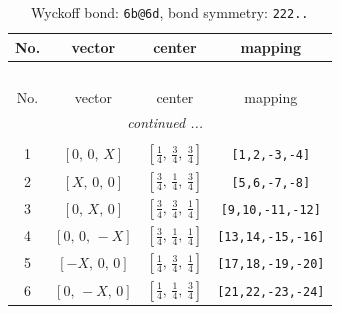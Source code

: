 \documentclass[fleqn,8pt]{jsarticle}
\begin{document}
\begin{longtable}{cccc}
\caption{Wyckoff bond: {\tt 6b@6d}, bond symmetry: {\tt 222..}}
 \\
 \hline \hline
No. & vector & center & mapping \\ \hline \endfirsthead

\multicolumn{3}{l}{\tablename\ \thetable{}} \\
 \hline \hline
No. & vector & center & mapping \\ \hline \endhead

 \hline \hline
\multicolumn{3}{r}{\footnotesize\it continued ...} \\ \endfoot

 \hline \hline
\multicolumn{3}{r}{} \\ \endlastfoot

1 & $\left[ 0,\, 0,\, X \right]$ & $\left[ \frac{1}{4},\, \frac{3}{4},\, \frac{3}{4} \right]$ & {\tt [1,2,-3,-4]} \\ \hline
2 & $\left[ X,\, 0,\, 0 \right]$ & $\left[ \frac{3}{4},\, \frac{1}{4},\, \frac{3}{4} \right]$ & {\tt [5,6,-7,-8]} \\ \hline
3 & $\left[ 0,\, X,\, 0 \right]$ & $\left[ \frac{3}{4},\, \frac{3}{4},\, \frac{1}{4} \right]$ & {\tt [9,10,-11,-12]} \\ \hline
4 & $\left[ 0,\, 0,\, - X \right]$ & $\left[ \frac{3}{4},\, \frac{1}{4},\, \frac{1}{4} \right]$ & {\tt [13,14,-15,-16]} \\ \hline
5 & $\left[ - X,\, 0,\, 0 \right]$ & $\left[ \frac{1}{4},\, \frac{3}{4},\, \frac{1}{4} \right]$ & {\tt [17,18,-19,-20]} \\ \hline
6 & $\left[ 0,\, - X,\, 0 \right]$ & $\left[ \frac{1}{4},\, \frac{1}{4},\, \frac{3}{4} \right]$ & {\tt [21,22,-23,-24]} \\
\end{longtable}
\renewcommand{\arraystretch}{1.2}
\end{document}
